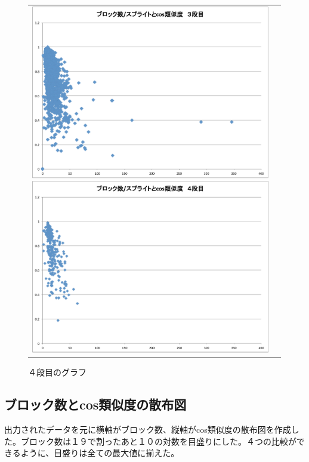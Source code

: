 \documentclass[a4paper,10pt,onecolumn,oneside,openany]{jsbook}
\begin{document}
\begin{figure}[h]
\begin{tabular}{cc}
\begin{minipage}[t]{0.45\hsize}
	 \centering
	 \includegraphics[keepaspectratio, scale = 0.25]{block_per_splite_3.pdf}
	 \caption{３段目のグラフ}
	 \label{third_splite}
	\end{minipage}
        \begin{minipage}[t]{0.45\hsize}
	 \centering
	 \includegraphics[keepaspectratio, scale = 0.25]{block_per_splite_4.pdf}
	 \caption{４段目のグラフ}
	 \label{fourth_splite}
	\end{minipage}
 \end{tabular}
 \end{figure}

\newpage
\subsection{ブロック数とcos類似度の散布図}
 出力されたデータを元に横軸がブロック数、縦軸がcos類似度の散布図を作成した。ブロック数は１９で割ったあと１０の対数を目盛りにした。４つの比較ができるように、目盛りは全ての最大値に揃えた。
\end{document}
